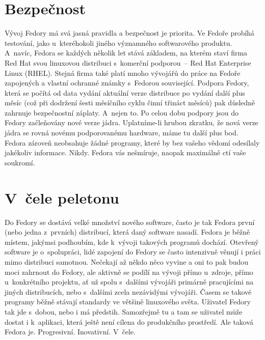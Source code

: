 \section*{Bezpečnost}
Vývoj Fedory má svá jasná pravidla a bezpečnost je priorita. Ve Fedoře probíhá testování, jako u~kteréhokoli jiného významného softwarového produktu. A~navíc, Fedora se každých několik let stává základem, na kterém staví firma Red Hat svou linuxovou distribuci s~komerční podporou~-- Red Hat Enterprise Linux (RHEL). Stejná firma také platí mnoho vývojářů do práce na Fedoře zapojených a vlastní ochranné známky s~Fedorou související. Podpora Fedory, která se počítá od data vydání aktuální verze distribuce po vydání další plus měsíc (což při dodržení šesti měsíčního cyklu činní třináct měsíců) pak důsledně zahrnuje bezpečnostní záplaty. A~nejen to. Po celou dobu podpory jsou do Fedory začleňovány nové verze jádra. Uplatníme-li hrubou zkratku, že nová verze jádra se rovná novému podporovanému hardware, máme tu další plus bod. Fedora zároveň neobsahuje žádné programy, které by bez vašeho vědomí odesílaly jakékoliv informace. Nikdy. Fedora vás nešmíruje, naopak maximálně ctí vaše soukromí.

\section*{V~čele peletonu}
Do Fedory se dostává velké množství nového software, často je tak Fedora první (nebo jedna z~prvních) distribucí, která daný software nasadí. Fedora je běžně místem, jakýmsi podhoubím, kde k~vývoji takových programů dochází. Otevřený software je o~spolupráci, lidé zapojení do Fedory se často intenzivně věnují i práci mimo distribuci samotnou. Nečekají až někdo něco vyvine a oni to pak budou moci zahrnout do Fedory, ale aktivně se podílí na vývoji přímo u~zdroje, přímo u~konkrétního projektu, ať už spolu s~dalšími vývojáři primárně pracujícími na jiných distribucích, nebo s~dalšími zcela nezávislými vývojáři. Časem se takové programy běžně stávají standardy ve většině linuxového světa. Uživatel Fedory tak jde s~dobou, nebo i má předstih. Samozřejmě tu a tam se uživatel může dostat i k~aplikaci, která ještě není cílena do produkčního prostředí. Ale taková Fedora je. Progresivní. Inovativní. V~čele.

